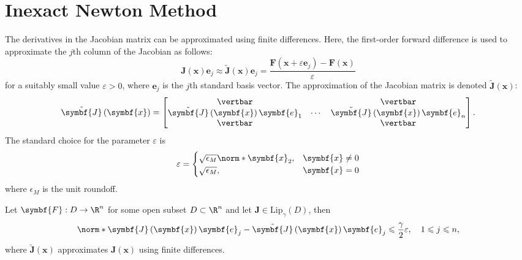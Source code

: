 \documentclass{article}
\begin{document}
\section{Inexact Newton Method}
The derivatives in the Jacobian matrix can be approximated using finite
differences. Here, the first-order forward difference is used to
approximate the \(j\)th column of the Jacobian as follows:
\begin{equation*}
    \symbf{J}\left( \symbf{x} \right) \symbf{e}_j \approx \tilde{\symbf{J}}\left( \symbf{x} \right) \symbf{e}_j = \frac{\symbf{F}\left( \symbf{x} + \varepsilon \symbf{e}_j \right) - \symbf{F}\left( \symbf{x} \right)}{\varepsilon}
\end{equation*}
for a suitably small value \(\varepsilon > 0\),
where \(\symbf{e}_j\) is the \(j\)th standard basis vector.
The approximation of the Jacobian matrix is denoted
\(\tilde{\symbf{J}}\left( \symbf{x} \right)\):
\begin{equation*}
    \tilde{\symbf{J}}\left( \symbf{x} \right) =
    \begin{bmatrix}
        \vertbar                                              &        & \vertbar                                              \\
        \tilde{\symbf{J}}\left( \symbf{x} \right) \symbf{e}_1 & \cdots & \tilde{\symbf{J}}\left( \symbf{x} \right) \symbf{e}_n \\
        \vertbar                                              &        & \vertbar
    \end{bmatrix}
    .
\end{equation*}
The standard choice for the parameter \(\varepsilon\) is
\begin{equation*}
    \varepsilon =
    \begin{cases}
        \sqrt{\epsilon_M} \norm*{\symbf{x}}_2, & \symbf{x} \neq 0 \\
        \sqrt{\epsilon_M},                     & \symbf{x} = 0
    \end{cases}
\end{equation*}
where \(\epsilon_M\) is the unit roundoff.
\begin{theorem}
    Let \(\symbf{F} : D \to \R^n\) for some open subset \(D \subset \R^n\)
    and let \(\symbf{J} \in \mathrm{Lip}_\gamma\left( D \right)\), then
    \begin{equation*}
        \norm*{\symbf{J}\left( \symbf{x} \right) \symbf{e}_j - \tilde{\symbf{J}}\left( \symbf{x} \right) \symbf{e}_j} \leqslant \frac{\gamma}{2} \varepsilon, \quad 1 \leqslant j \leqslant n,
    \end{equation*}
    where \(\tilde{\symbf{J}}\left( \symbf{x} \right)\) approximates
    \(\symbf{J}\left( \symbf{x} \right)\) using finite differences.
\end{theorem}
\end{document}

